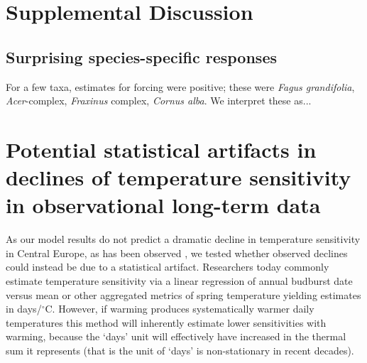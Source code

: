 \documentclass{article}
\begin{document}
\section*{Supplemental Discussion}


\subsection*{Surprising species-specific responses} 


For a few taxa, estimates for forcing were positive; these were \emph{Fagus grandifolia}, \emph{Acer}-complex, \emph{Fraxinus} complex, \emph{Cornus alba}. We interpret these as...

 



\section*{Potential statistical artifacts in declines of temperature sensitivity in observational long-term data} %
As our model results do not predict a dramatic decline in temperature sensitivity in Central Europe, as has been observed \citep[e.g.,][]{fu2015}, we tested whether observed declines could instead be due to a statistical artifact. Researchers today commonly estimate temperature sensitivity via a linear regression of annual budburst date versus mean or other aggregated metrics of spring temperature yielding estimates in days/$^{\circ}$C. However, if warming produces systematically warmer daily temperatures this method will inherently estimate lower sensitivities with warming, because the `days' unit will effectively have increased in the thermal sum it represents (that is the unit of `days' is non-stationary in recent decades).
\end{document}
